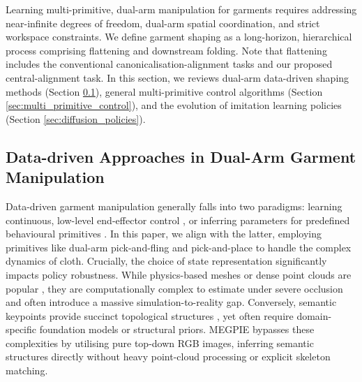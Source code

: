 \documentclass[journal]{IEEEtran}
\begin{document}
Learning multi-primitive, dual-arm manipulation for garments requires addressing near-infinite degrees of freedom, dual-arm spatial coordination, and strict workspace constraints. We define garment shaping as a long-horizon, hierarchical process comprising flattening and downstream folding. Note that flattening includes the conventional canonicalisation-alignment tasks \cite{canberk2022cloth} and our proposed central-alignment task. In this section, we reviews dual-arm data-driven shaping methods (Section \ref{sec:dual_arm_shaping}), general multi-primitive control algorithms (Section \ref{sec:multi_primitive_control}), and the evolution of imitation learning policies (Section \ref{sec:diffusion_policies}).

\subsection{Data-driven Approaches in Dual-Arm Garment Manipulation}
\label{sec:dual_arm_shaping}

Data-driven garment manipulation generally falls into two paradigms: learning continuous, low-level end-effector control \cite{black2024pi0, chi2025diffusion, huang2024rekep}, or inferring parameters for predefined behavioural primitives \cite{ha2022flingbot, avigal2022speedfolding}. In this paper, we align with the latter, employing primitives like dual-arm pick-and-fling and pick-and-place to handle the complex dynamics of cloth. Crucially, the choice of state representation significantly impacts policy robustness. While physics-based meshes or dense point clouds are popular \cite{wu2024unigarmentmanip, chen2025metafold}, they are computationally complex to estimate under severe occlusion and often introduce a massive simulation-to-reality gap. Conversely, semantic keypoints provide succinct topological structures \cite{deng2025clasp}, yet often require domain-specific foundation models or structural priors. MEGPIE bypasses these complexities by utilising pure top-down RGB images, inferring semantic structures directly without heavy point-cloud processing or explicit skeleton matching.
\end{document}
